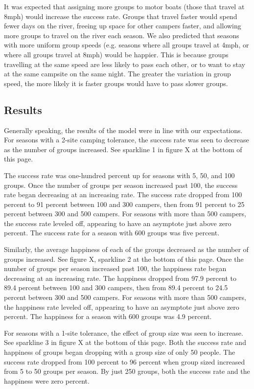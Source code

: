 \documentclass[11pt]{article} %
\begin{document}
It was expected that assigning more groups to motor boats (those that travel
at 8mph) would increase the success rate. Groups that travel faster would
spend fewer days on the river, freeing up space for other campers faster,
and allowing more groups to travel on the river each season. We also
predicted that seasons with more uniform group speeds (e.g. seasons where
all groups travel at 4mph, or where all groups travel at 8mph) would be
happier. This is because groups travelling at the same speed are less likely
to pass each other, or to want to stay at the same campsite on the same night.
The greater the variation in group speed, the more likely it is faster
groups would have to pass slower groups.

\subsection{Results}
\label{sec:results}
Generally speaking, the results of the model were in line with our
expectations. For seasons with a 2-site camping tolerance, the success rate
was seen to decrease as the number of groups increased. See sparkline 1 in
figure X at the bottom of this page.

The success rate was one-hundred percent up for seasons with 5, 50, and 100
groups. Once the number of groups per season increased past 100, the
success rate began decreasing at an increasing rate. The success rate
dropped from 100 percent to 91 percent between 100 and 300 campers, then
from 91 percent to 25 percent between 300 and 500 campers. For seasons with
more than 500 campers, the success rate leveled off, appearing to have an
asymptote just above zero percent. The success rate for a season with 600
groups was five percent.

Similarly, the average happiness of each of the groups decreased as the
number of groups increased. See figure X, sparkline 2 at the bottom of
this page. Once the number of groups per season increased past 100, the
happiness rate began decreasing at an increasing rate. The happiness dropped
from 97.9 percent to 89.4 percent between 100 and 300 campers, then from 89.4
percent to 24.5 percent between 300 and 500 campers. For seasons with more
than 500 campers, the happiness rate leveled off, appearing to have an
asymptote just above zero percent. The happiness for a season with 600 groups
was 4.9 percent.

For seasons with a  1-site tolerance, the effect of group size was seen to
increase. See sparkline 3 in figure X at the bottom of this page. Both the
success rate and happiness of groups began dropping with a group size of
only 50 people. The success rate dropped from 100 percent to 96 percent
when group sized increased from 5 to 50 groups per season. By just 250
groups, both the success rate and the happiness were zero percent.
\end{document}
